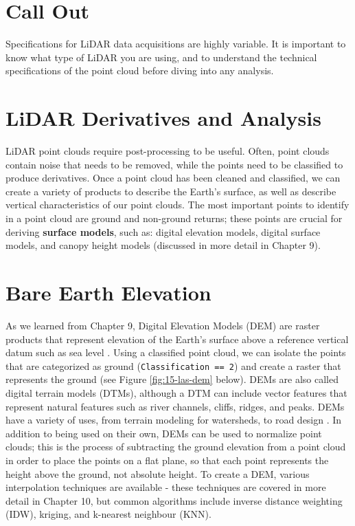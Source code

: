 \documentclass[
]{book}
\begin{document}
\hypertarget{call-out-4}{%
\section*{Call Out}\label{call-out-4}}

Specifications for LiDAR data acquisitions are highly variable. It is important to know what type of LiDAR you are using, and to understand the technical specifications of the point cloud before diving into any analysis.

\hypertarget{lidar-derivatives-and-analysis}{%
\section{LiDAR Derivatives and Analysis}\label{lidar-derivatives-and-analysis}}

LiDAR point clouds require post-processing to be useful. Often, point clouds contain noise that needs to be removed, while the points need to be classified to produce derivatives. Once a point cloud has been cleaned and classified, we can create a variety of products to describe the Earth's surface, as well as describe vertical characteristics of our point clouds. The most important points to identify in a point cloud are ground and non-ground returns; these points are crucial for deriving \textbf{surface models}, such as: digital elevation models, digital surface models, and canopy height models (discussed in more detail in Chapter 9).

\hypertarget{bare-earth-elevation}{%
\section{Bare Earth Elevation}\label{bare-earth-elevation}}

As we learned from Chapter 9, Digital Elevation Models (DEM) are raster products that represent elevation of the Earth's surface above a reference vertical datum such as sea level \citep{White2013}. Using a classified point cloud, we can isolate the points that are categorized as ground (\texttt{Classification\ ==\ 2}) and create a raster that represents the ground (see Figure \ref{fig:15-las-dem} below). DEMs are also called digital terrain models (DTMs), although a DTM can include vector features that represent natural features such as river channels, cliffs, ridges, and peaks. DEMs have a variety of uses, from terrain modeling for watersheds, to road design \citep{Roussel2021}. In addition to being used on their own, DEMs can be used to normalize point clouds; this is the process of subtracting the ground elevation from a point cloud in order to place the points on a flat plane, so that each point represents the height above the ground, not absolute height. To create a DEM, various interpolation techniques are available - these techniques are covered in more detail in Chapter 10, but common algorithms include inverse distance weighting (IDW), kriging, and k-nearest neighbour (KNN).
\end{document}
